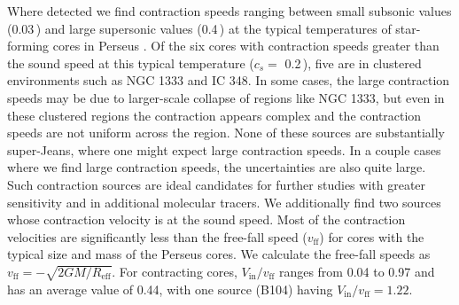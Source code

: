 \documentclass[iop,twocolappendix]{emulateapj}
\begin{document}
Where detected we find contraction speeds ranging between small subsonic values (0.03\,\kms) and large supersonic values (0.4\,\kms) at the typical temperatures of star-forming cores in Perseus \citep[$\sim 11$\,K;][]{Rosolowsky2008}. Of the six cores with contraction speeds greater than the sound speed at this typical temperature ($c_s =$ 0.2\,\kms), five are in clustered environments such as NGC 1333 and IC 348. In some cases, the large contraction speeds may be due to larger-scale collapse of regions like NGC 1333, but even in these clustered regions the contraction appears complex \citep{Walsh2006} and the contraction speeds are not uniform across the region. None of these sources are substantially super-Jeans, where one might expect large contraction speeds. In a couple cases where we find large contraction speeds, the uncertainties are also quite large. Such contraction sources are ideal candidates for further studies with greater sensitivity and in additional molecular tracers. We additionally find two sources whose contraction velocity is at the sound speed. Most of the contraction velocities are significantly less than the free-fall speed ($v_\mathrm{ff}$) for cores with the typical size and mass of the Perseus cores. We calculate the free-fall speeds as $v_\mathrm{ff} = - \sqrt{2GM/R_\mathrm{eff}}$. For contracting cores, $V_\mathrm{in} / v_\mathrm{ff}$ ranges from 0.04 to 0.97 and has an average value of 0.44, with one source (B104) having $V_\mathrm{in} / v_\mathrm{ff} = 1.22$. 

\end{document}
